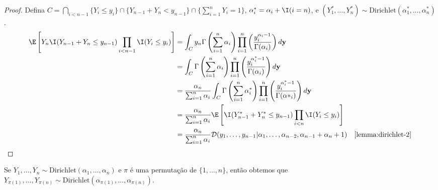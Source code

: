 \begin{proof}
 Defina $C = \bigcap_{i < n-1}\{Y_i \leq y_i\} 
 \cap \{Y_{n-1}+Y_{n} < y_{n-1}\} \cap 
 \{\sum_{i=1}^n Y_i = 1\}$,
 $\alpha^*_i = \alpha_i + \I(i=n)$, e
 $(Y^*_1,\ldots,Y^*_n) \sim \text{Dirichlet}
 (\alpha^*_1,\ldots,\alpha^*_n)$.
 \begin{align*}
  \E\left[Y_{n} \I(Y_{n-1}+Y_{n} \leq y_{n-1})
  \prod_{i < n-1} \I(Y_i \leq y_{i})\right]
  &= \int_C y_n \Gamma\left(\sum_{i=1}^n \alpha_i\right)
  \prod_{i=1}^n\left(\frac{y_i^{\alpha_i-1}}
  {\Gamma(\alpha_i)}\right) d \textbf{y} \\
  &= \int_C \Gamma\left(\sum_{i=1}^n \alpha_i\right)
  \prod_{i=1}^n\left(\frac{y_i^{\alpha^*_i-1}}
  {\Gamma(\alpha_i)}\right) d \textbf{y} \\
  &= \frac{\alpha_n}{\sum_{i=1}^n \alpha_i}
  \int_C \Gamma\left(\sum_{i=1}^n \alpha^*_i\right)
  \prod_{i=1}^n\left(\frac{y_i^{\alpha^*_i-1}}
  {\Gamma(\alpha *_i)}\right) d \textbf{y} \\
  &= \frac{\alpha_n}{\sum_{i=1}^n \alpha_i}
  \E\left[\I(Y^*_{n-1}+Y^*_{n} \leq y_{n-1})
  \prod_{i < n}\I(Y_i \leq y_i) \right] \\
  &= \frac{\alpha_n}{\sum_{i=1}^n \alpha_i}
  \mathcal{D}(y_1,\ldots,y_{n-1}|
  \alpha_1,\ldots,\alpha_{n-2},\alpha_{n-1}+\alpha_n+1)
  & \text{\cref{lemma:dirichlet-2}}
 \end{align*}
\end{proof}

\begin{lemma}
 \label{lemma:dirichlet-4}
 Se $Y_1,\ldots,Y_n \sim 
 \text{Dirichlet}(\alpha_1,\ldots,\alpha_n)$ e
 $\pi$ é uma permutação de $\{1,\ldots,n\}$,
 então obtemos que
 $Y_{\pi(1)},\ldots,Y_{\pi(n)} \sim 
 \text{Dirichlet}(\alpha_{\pi(1)},\ldots,\alpha_{\pi(n)})$.
\end{lemma}

